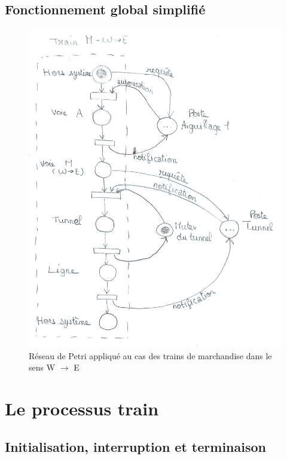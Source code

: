 \documentclass[a4paper,12pt]{article}
\begin{document}
\subsection{Fonctionnement global simplifié}

\begin{figure}[H]
	\centering
	\includegraphics[scale = 0.65]{img/reseau_petri.png}
	\caption{Réseau de Petri appliqué au cas des trains de marchandise dans le sens W $\rightarrow$ E}
\end{figure}


\section{Le processus train}

\subsection{Initialisation, interruption et terminaison}
\end{document}
